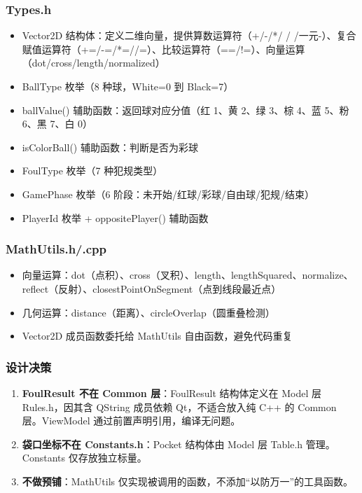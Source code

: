 \documentclass[11pt]{ctexart}
\begin{document}
\subsubsection{Types.h}

\begin{itemize}
\item Vector2D 结构体：定义二维向量，提供算数运算符（+/-/*/ / /一元-）、复合赋值运算符（+=/-=/*=//=）、比较运算符（==/!=）、向量运算（dot/cross/length/normalized）
\item BallType 枚举（8 种球，White=0 到 Black=7）
\item ballValue() 辅助函数：返回球对应分值（红 1、黄 2、绿 3、棕 4、蓝 5、粉 6、黑 7、白 0）
\item isColorBall() 辅助函数：判断是否为彩球
\item FoulType 枚举（7 种犯规类型）
\item GamePhase 枚举（6 阶段：未开始/红球/彩球/自由球/犯规/结束）
\item PlayerId 枚举 + oppositePlayer() 辅助函数
\end{itemize}

\subsubsection{MathUtils.h/.cpp}

\begin{itemize}
\item 向量运算：dot（点积）、cross（叉积）、length、lengthSquared、normalize、reflect（反射）、closestPointOnSegment（点到线段最近点）
\item 几何运算：distance（距离）、circleOverlap（圆重叠检测）
\item Vector2D 成员函数委托给 MathUtils 自由函数，避免代码重复
\end{itemize}

\subsubsection{设计决策}

\begin{enumerate}[leftmargin=*]
\item \textbf{FoulResult 不在 Common 层}：FoulResult 结构体定义在 Model 层 Rules.h，因其含 QString 成员依赖 Qt，不适合放入纯 C++ 的 Common 层。ViewModel 通过前置声明引用，编译无问题。
\item \textbf{袋口坐标不在 Constants.h}：Pocket 结构体由 Model 层 Table.h 管理。Constants 仅存放独立标量。
\item \textbf{不做预铺}：MathUtils 仅实现被调用的函数，不添加“以防万一”的工具函数。
\end{enumerate}
\end{document}
